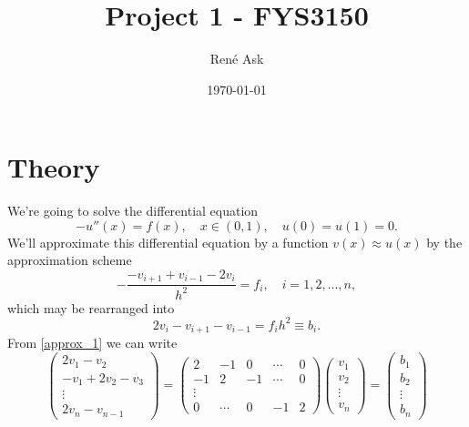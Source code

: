 \documentclass[english,notitlepage]{revtex4-1}  %
\begin{document}
\title{Project 1 - FYS3150}      %
\author{René Ask}          %
\date{\today}                             %
\noaffiliation                            %
\maketitle                                %

\section{Theory}
We're going to solve the differential equation 
\begin{equation}\label{diff_eq}
	-u''(x) = f(x), \quad x \in (0,1), \quad u(0)=u(1)=0.
\end{equation}
We'll approximate this differential equation by a function $v(x) \approx u(x)$ by the 
approximation scheme 
\begin{equation}
	-\frac{-v_{i+1}+v_{i-1} - 2v_i}{h^2} = f_i, \quad i=1,2,...,n,
\end{equation}
which may be rearranged into 
\begin{equation}\label{approx_1}
	2v_i - v_{i+1} - v_{i-1} = f_ih^2 \equiv b_i.
\end{equation}
From \eqref{approx_1} we can write 
\begin{equation}
	\begin{pmatrix}
	2v_1 - v_2 \\ 
	-v_1 + 2v_2 - v_3 \\ 
	\vdots \\
	2v_n - v_{n-1}
	\end{pmatrix}
	=
	\begin{pmatrix}
	2 & -1 & 0  & \cdots & 0 \\
	-1 & 2 & -1 & \cdots & 0 \\
	\vdots \\
	0 & \cdots & 0 & -1 & 2 
	\end{pmatrix}
	\begin{pmatrix}
	v_1 \\ v_2 \\ \vdots \\ v_n
	\end{pmatrix}
	= \begin{pmatrix}
	b_1 \\ b_2 \\ \vdots \\ b_n
	\end{pmatrix}
\end{equation}
\end{document}
